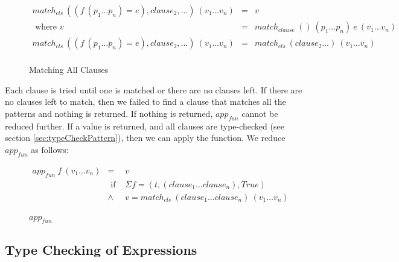 \begin{figure}[H]
  \begin{equation*}
    \begin{aligned}
      match_{cls} \: ((f \: (p_1 \dots p_n) = e), clause_2, \dots) \: (v_1 \dots v_n) & = & v                                                               \\
      \textrm{ where } v                                                              & = & match_{clause} \: () \: (p_1 \dots p_n) \: e \: (v_1 \dots v_n) \\
      match_{cls} \: ((f \: (p_1 \dots p_n) = e), clause_2, \dots) \: (v_1 \dots v_n) & = & match_{cls} \: (clause_2 \dots) \: (v_1 \dots v_n)              \\
    \end{aligned}
  \end{equation*}
  \caption{Matching All Clauses}
\end{figure}

Each clause is tried until one is matched or there are no clauses left. If there are no clauses left to match, then we failed to find a clause that matches all the patterns and nothing is returned. If nothing is returned, $app_{fun}$ cannot be reduced further. If a value is returned, and all clauses are type-checked (see section \ref{sec:typeCheckPattern}), then we can apply the function. We reduce $app_{fun}$ as follows:

\begin{figure}[H]
  \begin{equation*}
    \begin{aligned}
      app_{fun} \: f \: (v_1 \dots v_n) & =             & v                                                               \\
                                        & \textrm{ if } & \Sigma f = (t, (clause_1 \dots clause_n), True)                 \\
                                        & \land         & v = match_{cls} \: (clause_1 \dots clause_n) \: (v_1 \dots v_n) \\
    \end{aligned}
  \end{equation*}
  \caption{$app_{fun}$}
\end{figure}

\subsection{Type Checking of Expressions}

